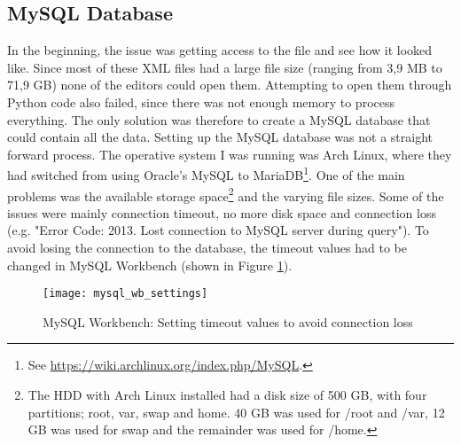 \subsection{MySQL Database}
In the beginning, the issue was getting access to the file and see how it looked like. Since most of these XML 
files had a large file size (ranging from 3,9 MB to 71,9 GB) none of the editors could open them. Attempting to 
open them through Python code also failed, since there was not enough memory to process everything. The only 
solution was therefore to create a MySQL database that could contain all the data. 
\vspace{0.5em}\newline
Setting up the MySQL database was not a straight forward process. The operative system I was running was Arch 
Linux, where they had switched from using Oracle's MySQL to MariaDB\footnote{See 
	\url{https://wiki.archlinux.org/index.php/MySQL}.}. One of the main problems was the available storage 
space\footnote{The HDD with Arch Linux installed had a disk size of 500 GB, with four partitions; root, var, 
	swap and home. 40 GB was used for /root and /var, 12 GB was used for swap and the remainder was used for 
	/home.} and the varying file sizes. Some of the issues were mainly connection timeout, no more disk space 
and connection loss (e.g. "Error Code: 2013. Lost connection to MySQL server during query"). To avoid losing 
the connection to the database, the timeout values had to be changed in MySQL Workbench 
(shown in Figure \ref{fig:mysql_wb_settings}).
\begin{figure}[ht]
	\centering
	\texttt{[image: mysql\_wb\_settings]}
	\caption{MySQL Workbench: Setting timeout values to avoid connection loss}
	\label{fig:mysql_wb_settings}
\end{figure}

